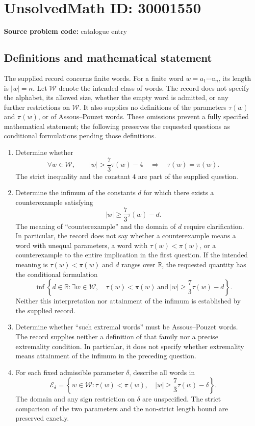 \documentclass[11pt]{article}
\newcommand{\R}{\mathbb{R}}
\begin{document}
\section*{UnsolvedMath ID: 30001550}
\textbf{Source problem code:} catalogue entry
\subsection{Definitions and mathematical statement}
The supplied record concerns finite words. For a finite word \(w=a_1\cdots a_n\), its length is \(|w|=n\). Let \(\mathcal W\) denote the intended class of words. The record does not specify the alphabet, its allowed size, whether the empty word is admitted, or any further restrictions on \(\mathcal W\). It also supplies no definitions of the parameters \(\tau(w)\) and \(\pi(w)\), or of Assous--Pouzet words. These omissions prevent a fully specified mathematical statement; the following preserves the requested questions as conditional formulations pending those definitions.

\begin{enumerate}
\item Determine whether
\[
\forall w\in\mathcal W,\qquad
|w|>\frac{7}{3}\tau(w)-4
\quad\Longrightarrow\quad
\tau(w)=\pi(w).
\]
The strict inequality and the constant \(4\) are part of the supplied question.

\item Determine the infimum of the constants \(d\) for which there exists a counterexample satisfying
\[
|w|\geq\frac{7}{3}\tau(w)-d.
\]
The meaning of ``counterexample'' and the domain of \(d\) require clarification. In particular, the record does not say whether a counterexample means a word with unequal parameters, a word with \(\tau(w)<\pi(w)\), or a counterexample to the entire implication in the first question. If the intended meaning is \(\tau(w)<\pi(w)\) and \(d\) ranges over \(\R\), the requested quantity has the conditional formulation
\[
\inf\left\{d\in\R:
\exists w\in\mathcal W,\quad
\tau(w)<\pi(w)\ \text{and}\
|w|\geq\frac{7}{3}\tau(w)-d
\right\}.
\]
Neither this interpretation nor attainment of the infimum is established by the supplied record.

\item Determine whether ``such extremal words'' must be Assous--Pouzet words. The record supplies neither a definition of that family nor a precise extremality condition. In particular, it does not specify whether extremality means attainment of the infimum in the preceding question.

\item For each fixed admissible parameter \(\delta\), describe all words in
\[
\mathcal E_{\delta}
=\left\{w\in\mathcal W:
\tau(w)<\pi(w),\quad
|w|\geq\frac{7}{3}\tau(w)-\delta
\right\}.
\]
The domain and any sign restriction on \(\delta\) are unspecified. The strict comparison of the two parameters and the non-strict length bound are preserved exactly.
\end{enumerate}
\end{document}
